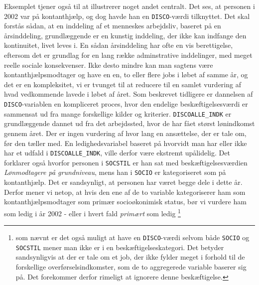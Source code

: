 Eksemplet tjener også til at illustrerer noget andet centralt. Det ses, at personen i 2002 var på kontanthjælp, og dog havde han en \texttt{DISCO}-værdi tilknyttet. Det skal forstås sådan, at en inddeling af et menneskes arbejdsliv, baseret på en årsinddeling, grundlæggende er en kunstig inddeling, der ikke kan indfange den kontinuitet, livet leves i. En sådan årsinddeling har ofte en vis berettigelse, eftersom det er grundlag for en lang række adminstrative inddelinger, med meget reelle sociale konsekvenser. Ikke desto mindre kan man sagtens være kontanthjælpsmodtager og have en en, to eller flere jobs i løbet af samme år, og det er en kompleksitet, vi er tvunget til at reducere til en samlet vurdering af hvad vedkommende lavede i løbet af året. Som beskrevet tidligere er dannelsen af \texttt{DISCO}-variablen en kompliceret proces, hvor den endelige beskæftigelsesværdi er sammensat ud fra mange forskellige kilder og kriterier. \texttt{DISCOALLE\_INDK} er grundlæggende dannet ud fra det arbejdssted, hvor de har fået størst lønindkomst gennem året. Der er ingen vurdering af hvor lang en ansættelse, der er tale om, før den tæller med. En ledighedsvariabel baseret på hvorvidt man har eller ikke har et udfald i \texttt{DISCOALLE\_INDK}, ville derfor være ekstremt upålidelig. Det forklarer også hvorfor personen i \texttt{SOCSTIL} er han sat med beskæftigelsesværdien \emph{Lønmodtagere på grundniveau}, mens han i \texttt{SOCIO} er kategoriseret som på kontanthjælp. Det er sandsynligt, at personen har været begge dele i dette år. Derfor mener vi netop, at hvis den ene af de to variable kategoriserer ham som kontanthjælpsmodtager som primær socioøkonimisk status, bør vi vurdere ham som ledig i år 2002 - eller i hvert fald \emph{primært} som ledig \footnote{som nævnt er det også muligt at have en \texttt{DISCO}-værdi selvom både \texttt{SOCIO} og \texttt{SOCSTIL} mener man ikke er i en beskæftigelseskategori. Det betyder sandsynligvis at der er tale om et job, der ikke fylder meget i forhold til de forskellige overførselsindkomster, som de to aggregerede variable baserer sig på. Det forekommer derfor rimeligt at ignorere denne beskæftigelse.}
% 
